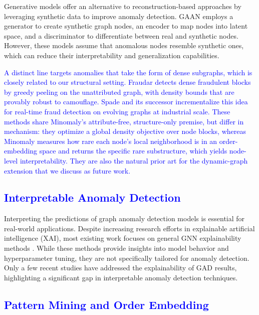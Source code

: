 \documentclass[preprint,12pt]{elsarticle}
\newcommand{\new}[1]{\textcolor{blue}{#1}}
\theoremstyle{plain}
\theoremstyle{definition}
\theoremstyle{remark}
\begin{document}
Generative models offer an alternative to reconstruction-based approaches by leveraging synthetic data to improve anomaly detection. GAAN \cite{chen2020generative} employs a generator to create synthetic graph nodes, an encoder to map nodes into latent space, and a discriminator to differentiate between real and synthetic nodes. However, these models assume that anomalous nodes resemble synthetic ones, which can reduce their interpretability and generalization capabilities.

\new{A distinct line targets anomalies that take the form of dense subgraphs, which is closely related to our structural setting. Fraudar \cite{hooi2016fraudar} detects dense fraudulent blocks by greedy peeling on the unattributed graph, with density bounds that are provably robust to camouflage. Spade \cite{jiang2023spade} and its successor \cite{chen2024rush} incrementalize this idea for real-time fraud detection on evolving graphs at industrial scale. These methods share Minomaly's attribute-free, structure-only premise, but differ in mechanism: they optimize a global density objective over node blocks, whereas Minomaly measures how rare each node's local neighborhood is in an order-embedding space and returns the specific rare substructure, which yields node-level interpretability. They are also the natural prior art for the dynamic-graph extension that we discuss as future work.}

\subsection{\new{Interpretable Anomaly Detection}}

Interpreting the predictions of graph anomaly detection models is essential for real-world applications. Despite increasing research efforts in explainable artificial intelligence (XAI), most existing work focuses on general GNN explainability methods \cite{jaykumar2023explain,wu2022trustworthy,ying2019gnnexplainer}. While these methods provide insights into model behavior and hyperparameter tuning, they are not specifically tailored for anomaly detection. Only a few recent studies \cite{YANG2024106463,liu2023towards,neuro2023explain,sun2020graph,shneiderman2020bridging,mansouri2023cosp} have addressed the explainability of GAD results, highlighting a significant gap in interpretable anomaly detection techniques.

\subsection{\new{Pattern Mining and Order Embedding}}
\end{document}
